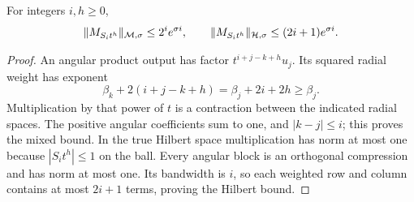 \begin{lemma}
\label{inf:mixed-multipliers}
For integers $i,h\ge0$,
\begin{equation}\label{inf:mixed-multiplier-bounds}
 \lVert M_{S_it^h}\rVert_{\mathcal M,\sigma}\le2^ie^{\sigma i},\qquad
 \lVert M_{S_it^h}\rVert_{\mathcal{H},\sigma}\le(2i+1)e^{\sigma i}.
\end{equation}
\end{lemma}
\begin{proof}
An angular product output has factor
$t^{i+j-k+h}u_j$. Its squared radial weight has exponent
\[
 \beta_k+2(i+j-k+h)=\beta_j+2i+2h\ge\beta_j.
\]
Multiplication by that power of $t$ is a contraction between the
indicated radial spaces. The positive angular coefficients sum to
one, and $|k-j|\le i$; this proves the mixed bound.
In the true Hilbert space multiplication has norm at most one
because $|S_it^h|\le1$ on the ball. Every angular block is an
orthogonal compression and has norm at most one. Its bandwidth
is $i$, so each weighted row and column contains at most $2i+1$
terms, proving the Hilbert bound.
\end{proof}

